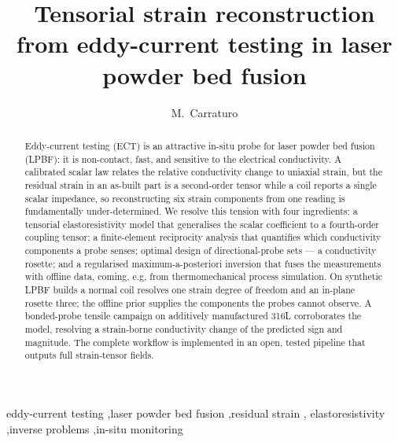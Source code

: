 \documentclass[preprint]{elsarticle}
\begin{document}
\begin{frontmatter}

\title{Tensorial strain reconstruction from eddy-current testing in
laser powder bed fusion}

\author[pv]{M.\ Carraturo}


\begin{abstract}
Eddy-current testing (ECT) is an attractive in-situ probe for laser powder bed
fusion (LPBF): it is non-contact, fast, and sensitive to the electrical
conductivity. A calibrated scalar law
relates the relative conductivity change to uniaxial strain, but the residual
strain in an as-built part is a second-order tensor while a coil reports a
single scalar impedance, so reconstructing six strain components from one
reading is fundamentally under-determined. We resolve this tension with four
ingredients: a tensorial elastoresistivity model that generalises the scalar
coefficient to a fourth-order coupling tensor; a finite-element reciprocity
analysis that quantifies which conductivity components a probe senses; optimal
design of directional-probe sets --- a conductivity rosette; and a regularised
maximum-a-posteriori inversion that fuses the measurements with offline data, coming, e.g, from
thermomechanical process simulation. 
On synthetic LPBF builds a normal coil
resolves one strain degree of freedom and an in-plane rosette three; the offline
prior supplies the components the probes cannot observe.
A bonded-probe tensile campaign on additively manufactured 316L corroborates the model, resolving a strain-borne conductivity change of the predicted sign and magnitude. 
The complete workflow is implemented in an open,
tested pipeline that outputs full strain-tensor fields.
\end{abstract}

\begin{keyword}
eddy-current testing \sep laser powder bed fusion \sep residual strain \sep
elastoresistivity \sep inverse problems \sep in-situ monitoring
\end{keyword}

\end{frontmatter}
\end{document}
